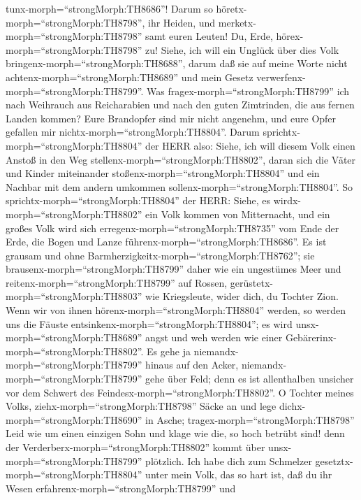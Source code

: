 tunx-morph=``strongMorph:TH8686''!  Darum so
höretx-morph=``strongMorph:TH8798'', ihr Heiden, und
merketx-morph=``strongMorph:TH8798'' samt euren Leuten! 
Du, Erde, hörex-morph=``strongMorph:TH8798'' zu! Siehe, ich will ein
Unglück über dies Volk bringenx-morph=``strongMorph:TH8688'', darum daß
sie auf meine Worte nicht achtenx-morph=``strongMorph:TH8689'' und mein
Gesetz verwerfenx-morph=``strongMorph:TH8799''.  Was
fragex-morph=``strongMorph:TH8799'' ich nach Weihrauch aus Reicharabien
und nach den guten Zimtrinden, die aus fernen Landen kommen? Eure
Brandopfer sind mir nicht angenehm, und eure Opfer gefallen mir
nichtx-morph=``strongMorph:TH8804''.  Darum
sprichtx-morph=``strongMorph:TH8804'' der HERR also: Siehe, ich will
diesem Volk einen Anstoß in den Weg
stellenx-morph=``strongMorph:TH8802'', daran sich die Väter und Kinder
miteinander stoßenx-morph=``strongMorph:TH8804'' und ein Nachbar mit dem
andern umkommen sollenx-morph=``strongMorph:TH8804''.  So
sprichtx-morph=``strongMorph:TH8804'' der HERR: Siehe, es
wirdx-morph=``strongMorph:TH8802'' ein Volk kommen von Mitternacht, und
ein großes Volk wird sich erregenx-morph=``strongMorph:TH8735'' vom Ende
der Erde,  die Bogen und Lanze
führenx-morph=``strongMorph:TH8686''. Es ist grausam und ohne
Barmherzigkeitx-morph=``strongMorph:TH8762''; sie
brausenx-morph=``strongMorph:TH8799'' daher wie ein ungestümes Meer und
reitenx-morph=``strongMorph:TH8799'' auf Rossen,
gerüstetx-morph=``strongMorph:TH8803'' wie Kriegsleute, wider dich, du
Tochter Zion.  Wenn wir von ihnen
hörenx-morph=``strongMorph:TH8804'' werden, so werden uns die Fäuste
entsinkenx-morph=``strongMorph:TH8804''; es wird
unsx-morph=``strongMorph:TH8689'' angst und weh werden wie einer
Gebärerinx-morph=``strongMorph:TH8802''.  Es gehe ja
niemandx-morph=``strongMorph:TH8799'' hinaus auf den Acker,
niemandx-morph=``strongMorph:TH8799'' gehe über Feld; denn es ist
allenthalben unsicher vor dem Schwert des
Feindesx-morph=``strongMorph:TH8802''.  O Tochter meines
Volks, ziehx-morph=``strongMorph:TH8798'' Säcke an und lege
dichx-morph=``strongMorph:TH8690'' in Asche;
tragex-morph=``strongMorph:TH8798'' Leid wie um einen einzigen Sohn und
klage wie die, so hoch betrübt sind! denn der
Verderberx-morph=``strongMorph:TH8802'' kommt über
unsx-morph=``strongMorph:TH8799'' plötzlich.  Ich habe dich
zum Schmelzer gesetztx-morph=``strongMorph:TH8804'' unter mein Volk, das
so hart ist, daß du ihr Wesen erfahrenx-morph=``strongMorph:TH8799'' und
